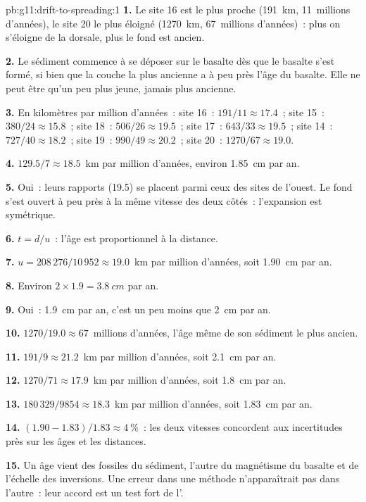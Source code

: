 \begin{solution}{pb:g11:drift-to-spreading:1}
\textbf{1.} Le site 16 est le plus proche (\qty{191}{km}, 11~millions
d'années), le site 20 le plus éloigné (\qty{1270}{km}, 67~millions
d'années)~: plus on s'éloigne de la dorsale, plus le fond est ancien.

\textbf{2.} Le sédiment commence à se déposer sur le basalte dès que le
basalte s'est formé, si bien que la couche la plus ancienne a à peu près
l'âge du basalte. Elle ne peut être qu'un peu plus jeune, jamais plus
ancienne.

\textbf{3.} En kilomètres par million d'années~: site 16~: $191/11 \approx 17.4$~;
site 15~: $380/24 \approx 15.8$~; site 18~: $506/26 \approx 19.5$~; site 17~:
$643/33 \approx 19.5$~; site 14~: $727/40 \approx 18.2$~; site 19~: $990/49
\approx 20.2$~; site 20~: $1270/67 \approx 19.0$.

\textbf{4.} $129.5/7 \approx \num{18.5}$~km par million d'années, environ
\qty{1.85}{cm} par an.

\textbf{5.} Oui~: leurs rapports (19.5) se placent parmi ceux des sites de
l'ouest. Le fond s'est ouvert à peu près à la même vitesse des deux
côtés~: l'expansion est symétrique.

\textbf{6.} $t = d/u$~: l'âge est proportionnel à la distance.

\textbf{7.} $u = 208\,276/10\,952 \approx \num{19.0}$~km par million
d'années, soit \qty{1.90}{cm} par an.

\textbf{8.} Environ $2 \times 1.9 = \qty{3.8}{cm}$ par an.

\textbf{9.} Oui~: \qty{1.9}{cm} par an, c'est un peu moins que
\qty{2}{cm} par an.

\textbf{10.} $1270/19.0 \approx 67$~millions d'années, l'âge même de son
sédiment le plus ancien.

\textbf{11.} $191/9 \approx \num{21.2}$~km par million d'années, soit
\qty{2.1}{cm} par an.

\textbf{12.} $1270/71 \approx \num{17.9}$~km par million d'années, soit
\qty{1.8}{cm} par an.

\textbf{13.} $180\,329/9854 \approx \num{18.3}$~km par million d'années,
soit \qty{1.83}{cm} par an.

\textbf{14.} $(1.90 - 1.83)/1.83 \approx \qty{4}{\percent}$~: les deux
vitesses concordent aux incertitudes près sur les âges et les distances.

\textbf{15.} Un âge vient des fossiles du sédiment, l'autre du magnétisme
du basalte et de l'échelle des inversions. Une erreur dans une méthode
n'apparaîtrait pas dans l'autre~: leur accord est un test fort de
l'.


\end{solution}
